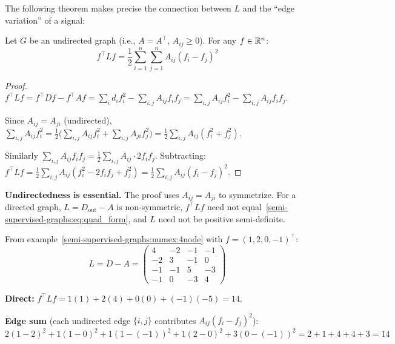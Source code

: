 \begin{notechapter}
The following theorem makes precise the connection between $L$ and the
``edge variation'' of a signal:

\begin{theorem}
\label{semi-supervised-graphs:thm:laplacian_quadratic}
Let $G$ be an undirected graph (i.e., $A = A^\top$, $A_{ij} \geq 0$).
For any $f \in \mathbb{R}^n$:
\begin{equation}
\label{semi-supervised-graphs:eq:quad_form}
f^\top L f = \frac{1}{2}\sum_{i=1}^n \sum_{j=1}^n A_{ij}(f_i - f_j)^2
\end{equation}
\end{theorem}

\begin{proof}
$f^\top L f = f^\top D f - f^\top A f = \sum_i d_i f_i^2 - \sum_{i,j} A_{ij}f_if_j
= \sum_{i,j} A_{ij}f_i^2 - \sum_{i,j} A_{ij}f_if_j$.

Since $A_{ij} = A_{ji}$ (undirected), $\sum_{i,j} A_{ij}f_i^2
= \frac{1}{2}\bigl(\sum_{i,j} A_{ij}f_i^2 + \sum_{i,j} A_{ji}f_j^2\bigr)
= \frac{1}{2}\sum_{i,j} A_{ij}(f_i^2 + f_j^2)$.

Similarly $\sum_{i,j} A_{ij}f_if_j = \frac{1}{2}\sum_{i,j}A_{ij}\cdot 2f_if_j$.
Subtracting:
$f^\top L f = \frac{1}{2}\sum_{i,j}A_{ij}(f_i^2 - 2f_if_j + f_j^2)
= \frac{1}{2}\sum_{i,j}A_{ij}(f_i - f_j)^2$.
\end{proof}

\begin{warningbox}
\textbf{Undirectedness is essential.} The proof uses $A_{ij} = A_{ji}$ to
symmetrize. For a directed graph, $L = D_{\mathrm{out}} - A$ is non-symmetric,
$f^\top Lf$ need not equal~\eqref{semi-supervised-graphs:eq:quad_form}, and $L$ need not be positive
semi-definite.
\end{warningbox}

\begin{numericalexample}[title=Verifying the Quadratic Form]
From example~\ref{semi-supervised-graphs:numex:4node} with $f = (1,2,0,-1)^\top$:
\[
L = D - A = \begin{pmatrix}
4&{-2}&{-1}&{-1}\\{-2}&3&{-1}&0\\{-1}&{-1}&5&{-3}\\{-1}&0&{-3}&4
\end{pmatrix}
\]

\textbf{Direct:} $f^\top Lf = 1(1) + 2(4) + 0(0) + (-1)(-5) = 14$.

\textbf{Edge sum} (each undirected edge $\{i,j\}$ contributes
$A_{ij}(f_i - f_j)^2$):
$2(1{-}2)^2 + 1(1{-}0)^2 + 1(1{-}(-1))^2 + 1(2{-}0)^2 + 3(0{-}(-1))^2
= 2+1+4+4+3 = 14$ \checkmark
\end{numericalexample}


\end{notechapter}
